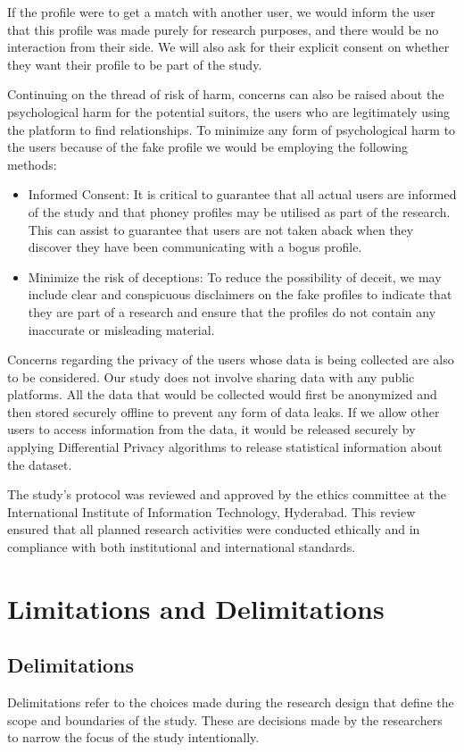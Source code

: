 If the profile were to get a match with another user, we would inform the user that this profile was made purely for research purposes, and there would be no interaction from their side. We will also ask for their explicit consent on whether they want their profile to be part of the study. 

Continuing on the thread of risk of harm, concerns can also be raised about the psychological harm for the potential suitors, the users who are legitimately using the platform to find relationships. To minimize any form of psychological harm to the users because of the fake profile we would be employing the following methods:
\begin{itemize}
    \item Informed Consent: It is critical to guarantee that all actual users are informed of the study and that phoney profiles may be utilised as part of the research. This can assist to guarantee that users are not taken aback when they discover they have been communicating with a bogus profile.
	\item Minimize the risk of deceptions: To reduce the possibility of deceit, we may include clear and conspicuous disclaimers on the fake profiles to indicate that they are part of a research and ensure that the profiles do not contain any inaccurate or misleading material.
\end{itemize}
Concerns regarding the privacy of the users whose data is being collected are also to be considered. Our study does not involve sharing data with any public platforms. All the data that would be collected would first be anonymized and then stored securely offline to prevent any form of data leaks. If we allow other users to access information from the data, it would be released securely by applying Differential Privacy algorithms to release statistical information about the dataset.

The study’s protocol was reviewed and approved by the ethics committee at the International Institute of Information Technology, Hyderabad. This review ensured that all planned research activities were conducted ethically and in compliance with both institutional and international standards.

\section{Limitations and Delimitations}
\subsection{Delimitations}
Delimitations refer to the choices made during the research design that define the scope and boundaries of the study. These are decisions made by the researchers to narrow the focus of the study intentionally.

